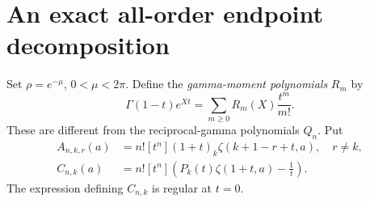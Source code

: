 \documentclass[11pt]{article}
\numberwithin{equation}{section}
\theoremstyle{definition}\newtheorem{definition}[theorem]{Definition}
\theoremstyle{remark}\newtheorem{remark}[theorem]{Remark}
\begin{document}
\section{An exact all-order endpoint decomposition}\label{sec:endpoint}
Set $\rho=e^{-\mu}$, $0<\mu<2\pi$. Define the \emph{gamma-moment polynomials} $R_m$ by
\begin{equation}\label{eq:Rgen}
\Gamma(1-t)e^{Xt}=\sum_{m\geq0}R_m(X)\frac{t^m}{m!}.
\end{equation}
These are different from the reciprocal-gamma polynomials $Q_n$. Put
\begin{align}
A_{n,k,r}(a)&=n![t^n](1+t)_k\zeta(k+1-r+t,a),\quad r\ne k,\label{eq:A}\\
C_{n,k}(a)&=n![t^n]\left(P_k(t)\zeta(1+t,a)-\frac1t\right).\label{eq:C}
\end{align}
The expression defining $C_{n,k}$ is regular at $t=0$.
\end{document}
